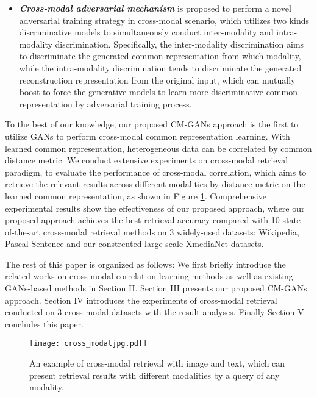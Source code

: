 \documentclass[journal]{IEEEtran}
\begin{document}
\begin{itemize}
{		%
	} 
	\item{
		\textbf{\textit{Cross-modal adversarial mechanism}} is proposed to perform a novel adversarial training strategy in cross-modal scenario, which utilizes two kinds discriminative models to simultaneously conduct inter-modality and intra-modality discrimination. Specifically, the inter-modality discrimination aims to discriminate the generated common representation from which modality, while the intra-modality discrimination tends to discriminate the generated reconstruction representation from the original input, which can mutually boost to force the generative models to learn more discriminative common representation by adversarial training process.
	} 
\end{itemize}

To the best of our knowledge, our proposed CM-GANs approach is the first to utilize GANs to perform cross-modal common representation learning. 
With learned common representation, heterogeneous data can be correlated by common distance metric. We conduct extensive experiments on cross-modal retrieval paradigm, to evaluate the performance of cross-modal correlation, which aims to retrieve the relevant results across different modalities by distance metric on the learned common representation, as shown in Figure \ref{fig_cross_media}. Comprehensive experimental results show the effectiveness of our proposed approach, where our proposed approach achieves the best retrieval accuracy compared with 10 state-of-the-art cross-modal retrieval methods on 3 widely-used datasets: Wikipedia, Pascal Sentence and our constrcuted large-scale XmediaNet datasets.

The rest of this paper is organized as follows: We first briefly introduce the related works on cross-modal correlation learning methods as well as existing GANs-based methods in Section II. Section III presents our proposed CM-GANs approach. Section IV introduces the experiments of cross-modal retrieval conducted on 3 cross-modal datasets with the result analyses. Finally Section V concludes this paper.

\begin{figure}[!t]
	\centering
	\texttt{[image: cross\_modaljpg.pdf]}
	\caption{An example of cross-modal retrieval with image and text, which can	present retrieval results with different modalities by a query of any modality.}
	\label{fig_cross_media}
\end{figure}
\end{document}
